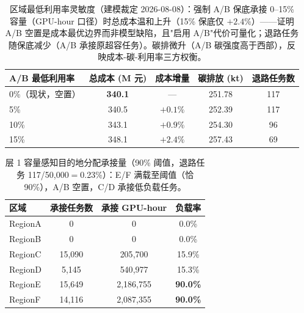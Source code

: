 \begin{table}[h]
\centering
\footnotesize
\begin{tabular}{lcccc}
\toprule
A/B 最低利用率 & 总成本 (M 元) & 成本增量 & 碳排放 (kt) & 退路任务数 \\
\midrule
0\%（现状，空置） & \textbf{340.1} & --- & 251.78 & 117 \\
5\% & 340.5 & $+0.1\%$ & 252.39 & 117 \\
10\% & 343.1 & $+0.9\%$ & 254.30 & 96 \\
15\% & 348.1 & $+2.4\%$ & 257.43 & 69 \\
\bottomrule
\end{tabular}
\caption{区域最低利用率灵敏度（建模裁定 2026-08-08）：强制 A/B 保底承接 0--15\% 容量（GPU-hour 口径）时总成本温和上升（15\% 保底仅 $+2.4\%$）——证明 A/B 空置是成本最优边界而非模型缺陷，且"启用 A/B"代价可量化；退路任务随保底减少（A/B 承接原超容任务）。碳排微升（A/B 碳强度高于西部），反映成本-碳-利用率三方权衡。}
\label{tab:s2-minutil}
\end{table}

\begin{table}[h]
\centering
\footnotesize
\begin{tabular}{lccc}
\toprule
区域 & 承接任务数 & 承接 GPU-hour & 负载率 \\
\midrule
RegionA & 0 & 0 & 0.0\% \\
RegionB & 0 & 0 & 0.0\% \\
RegionC & 15{,}090 & 205{,}700 & 15.9\% \\
RegionD & 5{,}145 & 540{,}977 & 15.3\% \\
RegionE & 15{,}649 & 2{,}186{,}755 & \textbf{90.0\%} \\
RegionF & 14{,}116 & 2{,}087{,}355 & \textbf{90.0\%} \\
\bottomrule
\end{tabular}
\caption{层 1 容量感知目的地分配承接量（90\% 阈值，退路任务 117/50{,}000$=$0.23\%）：E/F 满载至阈值（恰 90\%），A/B 空置，C/D 承接低负载任务。}
\label{tab:s2-assign}
\end{table}
